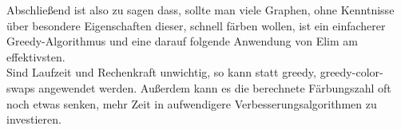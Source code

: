\documentclass[11pt]{article}
\begin{document}
Abschließend ist also zu sagen dass, sollte man viele Graphen, ohne Kenntnisse über besondere Eigenschaften dieser, schnell färben wollen, ist ein einfacherer Greedy-Algorithmus und eine darauf folgende Anwendung von Elim am effektivsten. \\
Sind Laufzeit und Rechenkraft unwichtig, so kann statt greedy, greedy-color-swaps angewendet werden. Außerdem kann es die berechnete Färbungszahl oft noch etwas senken, mehr Zeit in aufwendigere Verbesserungsalgorithmen zu investieren.



\end{document}
